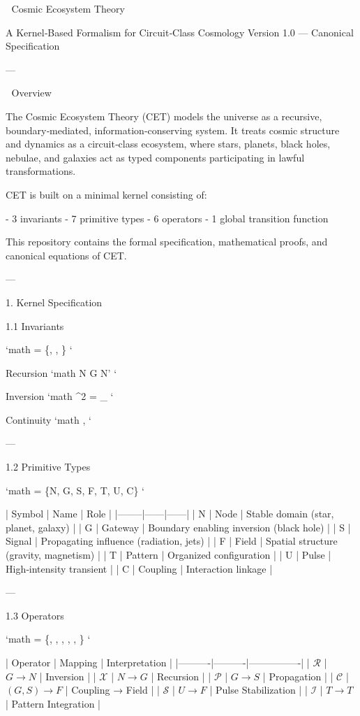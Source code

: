 
🌌 Cosmic Ecosystem Theory

A Kernel‑Based Formalism for Circuit‑Class Cosmology
Version 1.0 — Canonical Specification

---

📘 Overview

The Cosmic Ecosystem Theory (CET) models the universe as a recursive, boundary‑mediated, information‑conserving system.  
It treats cosmic structure and dynamics as a circuit‑class ecosystem, where stars, planets, black holes, nebulae, and galaxies act as typed components participating in lawful transformations.

CET is built on a minimal kernel consisting of:

- 3 invariants  
- 7 primitive types  
- 6 operators  
- 1 global transition function  

This repository contains the formal specification, mathematical proofs, and canonical equations of CET.

---

1. Kernel Specification

1.1 Invariants

`math
 = \{, , \}
`

Recursion
`math
N  G  N'
`

Inversion
`math
^2 = _{}
`

Continuity
`math
\forall {} \in {},\;  \equiv {}
`

---

1.2 Primitive Types

`math
 = \{N, G, S, F, T, U, C\}
`

| Symbol | Name | Role |
|--------|------|------|
| N | Node | Stable domain (star, planet, galaxy) |
| G | Gateway | Boundary enabling inversion (black hole) |
| S | Signal | Propagating influence (radiation, jets) |
| F | Field | Spatial structure (gravity, magnetism) |
| T | Pattern | Organized configuration |
| U | Pulse | High‑intensity transient |
| C | Coupling | Interaction linkage |

---

1.3 Operators

`math
 = \{, , , , , \}
`

| Operator | Mapping | Interpretation |
|----------|----------|----------------|
| \(\mathcal{R}\) | \(G \rightarrow N\) | Inversion |
| \(\mathcal{X}\) | \(N \rightarrow G\) | Recursion |
| \(\mathcal{P}\) | \(G \rightarrow S\) | Propagation |
| \(\mathcal{C}\) | \((G, S) \rightarrow F\) | Coupling → Field |
| \(\mathcal{S}\) | \(U \rightarrow F\) | Pulse Stabilization |
| \(\mathcal{I}\) | \(T \rightarrow T\) | Pattern Integration |

